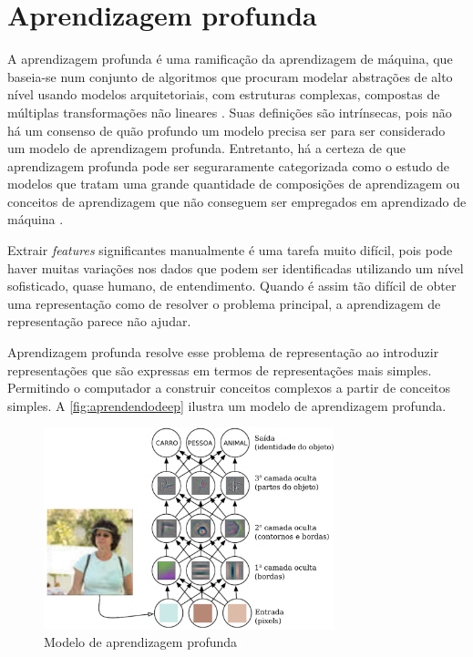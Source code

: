 \section{Aprendizagem profunda}

A aprendizagem profunda é uma ramificação da aprendizagem de máquina, que baseia-se num conjunto de algoritmos que procuram modelar abstrações de alto nível usando modelos arquitetoriais, com estruturas complexas, compostas de múltiplas transformações não lineares \cite{deng2014deep}. Suas definições são intrínsecas, pois não há um consenso de quão profundo um modelo precisa ser para ser considerado um modelo de aprendizagem profunda. Entretanto, há a certeza de que aprendizagem profunda pode ser seguraramente categorizada como o estudo de modelos que tratam uma grande quantidade de composições de aprendizagem ou conceitos de aprendizagem que não conseguem ser empregados em aprendizado de máquina \cite{Bengio-et-al-2015-Book}. 




Extrair \textit{features} significantes manualmente é uma tarefa muito difícil, pois pode haver muitas variações nos dados que podem ser identificadas utilizando um nível sofisticado, quase humano, de entendimento. Quando é assim tão difícil de obter uma representação como de resolver o problema principal, a aprendizagem de representação parece não ajudar. 

Aprendizagem profunda resolve esse problema de representação ao introduzir representações que são expressas em termos de representações mais simples. Permitindo o computador a construir conceitos complexos a partir de conceitos simples. A \autoref{fig:aprendendodeep} ilustra um modelo de aprendizagem profunda.

\begin{figure}
\centering
\caption{Modelo de aprendizagem profunda} \label{fig:aprendendodeep}
\includegraphics[width=0.75\textwidth]{img/aprendendodeep.pdf}
\end{figure}

